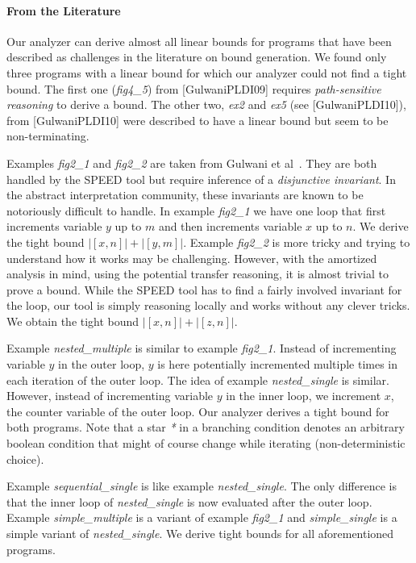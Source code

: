 \documentclass[nocopyrightspace,preprint]{sigplanconf}
\begin{document}
\paragraph{From  the Literature}

Our analyzer can derive almost all linear bounds for programs that
have been described as challenges in the literature on bound
generation.  We found only three programs with a linear bound for
which our analyzer could not find a tight bound.  The first one
(\emph{fig4\_5}) from [GulwaniPLDI09] requires \emph{path-sensitive
  reasoning} to derive a bound.  The other two, \emph{ex2} and
\emph{ex5} (see [GulwaniPLDI10]), from [GulwaniPLDI10] were described
to have a linear bound but seem to be non-terminating.

Examples \emph{fig2\_1} and \emph{fig2\_2} are taken from Gulwani et
al~\cite{GulwaniMC09}.  They are both handled by the SPEED tool but
require inference of a \emph{disjunctive invariant}.  In the abstract
interpretation community, these invariants are known to be notoriously
difficult to handle.
%
In example \emph{fig2\_1} we have one loop that first increments
variable $y$ up to $m$ and then increments variable $x$ up to $n$.  We
derive the tight bound $|[x, n]| + |[y, m]|$.
%
Example \emph{fig2\_2} is more tricky and trying to understand how it
works may be challenging.  However, with the amortized analysis in
mind, using the potential transfer reasoning, it is almost trivial to
prove a bound.  While the SPEED tool has to find a fairly
involved invariant for the loop, our tool is simply reasoning locally
and works without any clever tricks. We obtain the tight bound $|[x,
n]| + |[z, n]|$.

Example \emph{nested\_multiple} is similar to example \emph{fig2\_1}.
Instead of incrementing variable $y$ in the outer loop, $y$ is here
potentially incremented multiple times in each iteration of the outer
loop.  The idea of example \emph{nested\_single} is similar.  However,
instead of incrementing variable $y$ in the inner loop, we increment
$x$, the counter variable of the outer loop. Our analyzer derives a
tight bound for both programs.  Note that a star \emph{*} in a
branching condition denotes an arbitrary boolean condition that might
of course change while iterating (non-deterministic choice).

Example \emph{sequential\_single} is like example
\emph{nested\_single}.  The only difference is that the inner loop of
\emph{nested\_single} is now evaluated after the outer loop.  Example
\emph{simple\_multiple} is a variant of example \emph{fig2\_1} and
\emph{simple\_single} is a simple variant of \emph{nested\_single}.
We derive tight bounds for all aforementioned programs.
\end{document}
